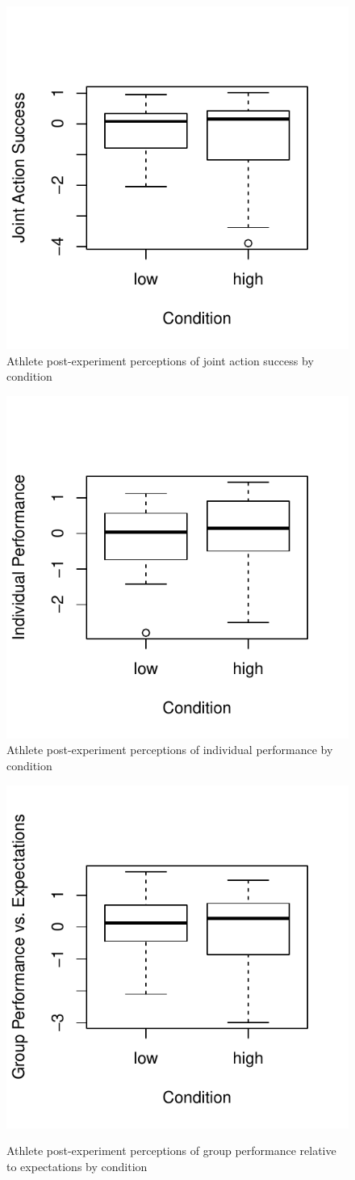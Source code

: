 \begin{figure}
    \centering \includegraphics[width=0.5\linewidth,keepaspectratio] {images/groupJointActionSuccessPostBoxPlot-1}
    \caption{Athlete post-experiment perceptions of joint action success by condition}
              \label{fig:groupJointActionSuccessPostBoxPlot}
\end{figure}

\begin{figure}
  \centering
  \includegraphics[width=0.5\linewidth,keepaspectratio] {images/indComponentPerformancePostBoxPlot-1}
  \caption{Athlete post-experiment perceptions of individual performance by condition}
    \label{fig:indComponentPerformancePostBoxPlot}
\end{figure}

\begin{figure}
  \centering
  \includegraphics[width=0.5\linewidth,keepaspectratio] {images/groupPerfExpPostBoxPlot-1}
          \label{fig:groupPerfExpPostBoxPlot}
        \caption{Athlete post-experiment perceptions of group performance relative to expectations by condition}
\end{figure}


